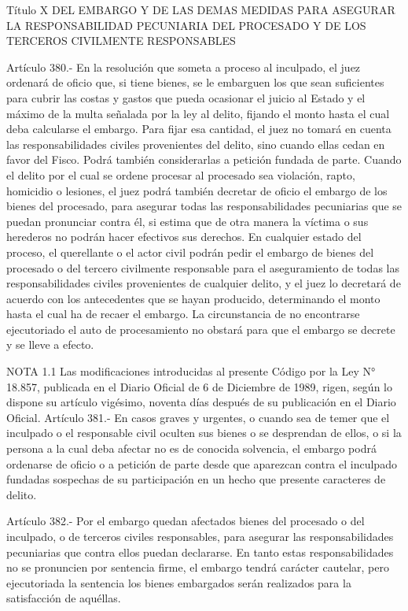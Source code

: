   Título X
  DEL EMBARGO Y DE LAS DEMAS MEDIDAS PARA ASEGURAR LA
RESPONSABILIDAD PECUNIARIA DEL PROCESADO Y DE LOS TERCEROS
CIVILMENTE RESPONSABLES




  Artículo 380.-  En la resolución que someta a proceso al inculpado, el juez ordenará de oficio que, si tiene bienes, se le embarguen los que sean suficientes para cubrir las costas y gastos que pueda ocasionar el juicio al Estado y el máximo de la multa señalada por la ley al delito, fijando el monto hasta el cual deba calcularse el embargo.
    Para fijar esa cantidad, el juez no tomará en cuenta las responsabilidades civiles provenientes del delito, sino cuando ellas cedan en favor del Fisco.
    Podrá también considerarlas a petición fundada de parte.
    Cuando el delito por el cual se ordene procesar al procesado sea violación, rapto, homicidio o lesiones, el juez podrá también decretar de oficio el embargo de los bienes del procesado, para asegurar todas las responsabilidades pecuniarias que se puedan pronunciar contra él, si estima que de otra manera la víctima o sus herederos no podrán hacer efectivos sus derechos.
    En cualquier estado del proceso, el querellante o el actor civil podrán pedir el embargo de bienes del procesado o del tercero civilmente responsable para el aseguramiento de todas las responsabilidades civiles provenientes de cualquier delito, y el juez lo decretará de acuerdo con los antecedentes que se hayan producido, determinando el monto hasta el cual ha de recaer el embargo.
    La circunstancia de no encontrarse ejecutoriado el auto de procesamiento no obstará para que el embargo se decrete y se lleve a efecto.




NOTA 1.1
      Las modificaciones introducidas al presente Código por la Ley N° 18.857, publicada en el Diario Oficial de 6 de Diciembre de 1989, rigen, según lo dispone su artículo vigésimo, noventa días después de su publicación en el Diario Oficial.
    Artículo 381.-  En casos graves y urgentes, o cuando sea de temer que el inculpado o el responsable civil oculten sus bienes o se desprendan de ellos, o si la persona a la cual deba afectar no es de conocida solvencia, el embargo podrá ordenarse de oficio o a petición de parte desde que aparezcan contra el inculpado fundadas sospechas de su participación en un hecho que presente caracteres de delito.

    Artículo 382.-  Por el embargo quedan afectados bienes del procesado o del inculpado, o de terceros civiles responsables, para asegurar las responsabilidades pecuniarias que contra ellos puedan declararse. En tanto estas responsabilidades no se pronuncien por sentencia firme, el embargo tendrá carácter cautelar, pero ejecutoriada la sentencia los bienes embargados serán realizados para la satisfacción de aquéllas.

